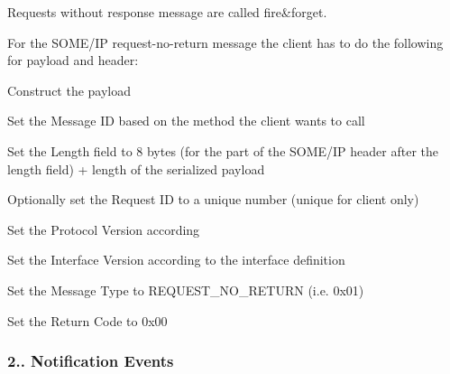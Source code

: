 \begin{DoxyItemize}
\item Requests without response message are called fire\&forget. 
\item For the S\+O\+M\+E/\+IP request-\/no-\/return message the client has to do the following for payload and header\+:
\begin{DoxyItemize}
\item Construct the payload
\item Set the Message ID based on the method the client wants to call
\item Set the Length field to 8 bytes (for the part of the S\+O\+M\+E/\+IP header after the length field) + length of the serialized payload
\item Optionally set the Request ID to a unique number (unique for client only)
\item Set the Protocol Version according
\item Set the Interface Version according to the interface definition
\item Set the Message Type to R\+E\+Q\+U\+E\+S\+T\+\_\+\+N\+O\+\_\+\+R\+E\+T\+U\+RN (i.\+e. 0x01)
\item Set the Return Code to 0x00
\end{DoxyItemize}
\end{DoxyItemize}

\subsubsection*{2.. Notification Events}


